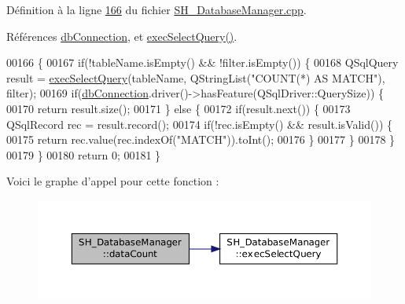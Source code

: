 Définition à la ligne \hyperlink{SH__DatabaseManager_8cpp_source_l00166}{166} du fichier \hyperlink{SH__DatabaseManager_8cpp_source}{S\-H\-\_\-\-Database\-Manager.\-cpp}.



Références \hyperlink{classSH__DatabaseManager_a9291f61c3abbba2c4f1567b1d8325f0e}{db\-Connection}, et \hyperlink{classSH__DatabaseManager_ab8f9850cb68444ab9a4e613b36a3b044}{exec\-Select\-Query()}.


\begin{DoxyCode}
00166                                                                    \{
00167     \textcolor{keywordflow}{if}(!tableName.isEmpty() && !filter.isEmpty()) \{
00168         QSqlQuery result = \hyperlink{classSH__DatabaseManager_ab8f9850cb68444ab9a4e613b36a3b044}{execSelectQuery}(tableName, QStringList(\textcolor{stringliteral}{"COUNT(*) AS MATCH"}), 
      filter);
00169         \textcolor{keywordflow}{if}(\hyperlink{classSH__DatabaseManager_a9291f61c3abbba2c4f1567b1d8325f0e}{dbConnection}.driver()->hasFeature(QSqlDriver::QuerySize)) \{
00170             \textcolor{keywordflow}{return} result.size();
00171         \} \textcolor{keywordflow}{else} \{
00172             \textcolor{keywordflow}{if}(result.next()) \{
00173                 QSqlRecord rec = result.record();
00174                 \textcolor{keywordflow}{if}(!rec.isEmpty()  && result.isValid()) \{
00175                     \textcolor{keywordflow}{return} rec.value(rec.indexOf(\textcolor{stringliteral}{"MATCH"})).toInt();
00176                 \}
00177             \}
00178         \}
00179     \}
00180     \textcolor{keywordflow}{return} 0;
00181 \}
\end{DoxyCode}


Voici le graphe d'appel pour cette fonction \-:\nopagebreak
\begin{figure}[H]
\begin{center}
\leavevmode
\includegraphics[width=350pt]{classSH__DatabaseManager_ad3e372d89b60b43e3f3bae649be6d7fb_cgraph}
\end{center}
\end{figure}


